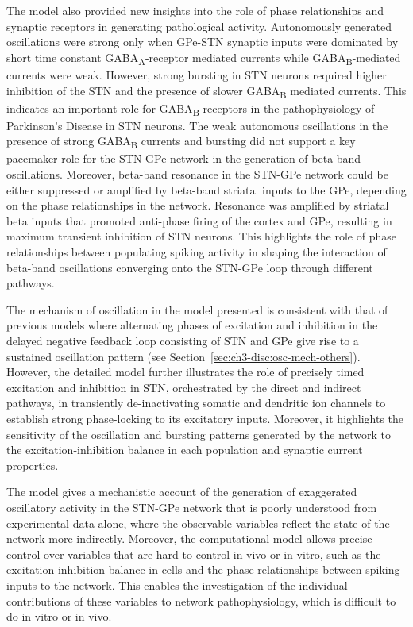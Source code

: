 The model also provided new insights into the role of phase relationships and
synaptic receptors in generating pathological activity. Autonomously generated oscillations
were strong only when GPe-STN synaptic inputs were dominated by
short time constant GABA\textsubscript{A}-receptor mediated currents while
GABA\textsubscript{B}-mediated currents were weak. However, strong bursting in STN
neurons required higher inhibition of the STN and the presence of slower
GABA\textsubscript{B} mediated currents. This indicates an important role for
GABA\textsubscript{B} receptors in the pathophysiology of Parkinson's Disease
in STN neurons. The weak autonomous oscillations in the presence of strong
GABA\textsubscript{B} currents and bursting did not support
a key pacemaker role for the STN-GPe network in the generation of beta-band
oscillations. Moreover, beta-band resonance in the STN-GPe network could be either suppressed
or amplified by beta-band striatal inputs to the GPe, depending on the
phase relationships in the network. Resonance was amplified by striatal beta
inputs that promoted anti-phase firing of the cortex and GPe, resulting in
maximum transient inhibition of STN neurons. This highlights the role of
phase relationships between populating spiking activity in shaping
the interaction of beta-band oscillations converging onto the STN-GPe loop
through different pathways.

%
The mechanism of oscillation in the model presented is consistent with that
of previous models where alternating phases of excitation and inhibition
in the delayed negative feedback loop consisting of STN and GPe give rise to
a sustained oscillation pattern (see Section~\ref{sec:ch3-disc:osc-mech-others}).
However, the detailed model further illustrates the role of precisely timed
excitation and inhibition in STN, orchestrated by the direct and indirect pathways,
in transiently de-inactivating somatic and dendritic ion channels to establish
strong phase-locking to its excitatory inputs.
Moreover, it highlights the sensitivity of the oscillation and bursting patterns
generated by the network to the excitation-inhibition balance in each population and synaptic current properties.
%

The model gives a mechanistic account of the generation of exaggerated
oscillatory activity in the STN-GPe network that is poorly understood
from experimental data alone, where the observable variables reflect
the state of the network more indirectly. %
Moreover, the computational model allows precise control over variables
that are hard to control in vivo or in vitro, such as the excitation-inhibition
balance in cells and the phase relationships between spiking inputs to the network.
This enables the investigation of the individual contributions of these
variables to network pathophysiology, which is difficult to do in vitro or in vivo.

